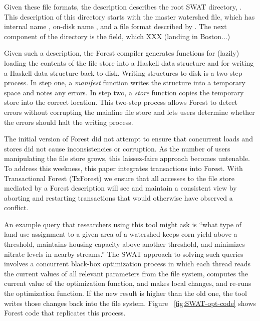 Given these file formats, the description describes the root SWAT
directory, .  This description of this directory
starts with the master watershed file, which has internal name
, on-disk name , and a file format
described by .  The next component of the
directory is the  field, which XXX (landing in Boston...)




Given such a description, the Forest compiler generates functions for
(lazily) loading the contents of the file store into a Haskell data
structure and for writing a Haskell data structure back to disk.
Writing structures to disk is a two-step process.  In step one, a
\textit{manifest} function writes the structure into a temporary space
and notes any errors.  In step two, a \textit{store} function copies
the temporary store into the correct location.  This two-step process
allows Forest to detect errors without corrupting the mainline
file store and lets users determine whether the errors should halt the
writing process.

The initial version of Forest did not attempt to ensure that 
concurrent loads and stores did not cause inconsistencies or
corruption.  As the number of users manipulating the file store grows,
this laissez-faire approach becomes untenable.  To address this
weekness, this paper integrates transactions into Forest.  With
Transactional Forest (TxForest) we ensure that all accesses to the
file store mediated by a Forest description will see and maintain a
consistent view by aborting and restarting transactions that would
otherwise have observed a conflict.


An example query that researchers using this tool might ask is
``what type of land use assignment to a given area of a watershed
keeps corn yield above a threshold, maintains housing capacity above
another threshold, and minimizes nitrate levels in nearby streams.''
The SWAT approach to solving such queries involves a concurrent black-box
optimization process in which each thread reads the current values of
all relevant parameters from the file system, computes the current
value of the optimization function, and makes local changes, and re-runs
the optimization function. If the new result is higher than the old
one, the tool writes those changes back into the file system.  Figure
~\ref{fig:SWAT-opt-code} shows Forest code that replicates this process.


